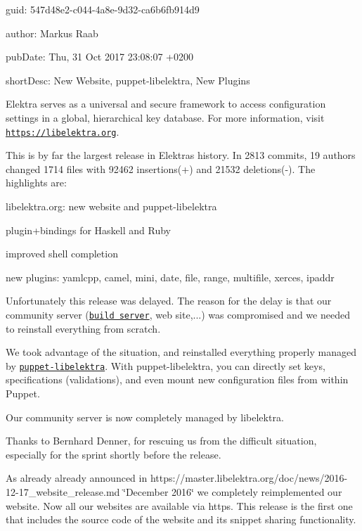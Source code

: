 
\begin{DoxyItemize}
\item guid\+: 547d48e2-\/c044-\/4a8e-\/9d32-\/ca6b6fb914d9
\item author\+: Markus Raab
\item pub\+Date\+: Thu, 31 Oct 2017 23\+:08\+:07 +0200
\item short\+Desc\+: New Website, puppet-\/libelektra, New Plugins
\end{DoxyItemize}

Elektra serves as a universal and secure framework to access configuration settings in a global, hierarchical key database. For more information, visit \href{https://libelektra.org}{\tt https\+://libelektra.\+org}.

This is by far the largest release in Elektra\textquotesingle{}s history. In 2813 commits, 19 authors changed 1714 files with 92462 insertions(+) and 21532 deletions(-\/). The highlights are\+:


\begin{DoxyItemize}
\item libelektra.\+org\+: new website and puppet-\/libelektra
\item plugin+bindings for Haskell and Ruby
\item improved shell completion
\item new plugins\+: yamlcpp, camel, mini, date, file, range, multifile, xerces, ipaddr
\end{DoxyItemize}

Unfortunately this release was delayed. The reason for the delay is that our community server (\href{https://build.libelektra.org}{\tt build server}, web site,...) was compromised and we needed to reinstall everything from scratch.

We took advantage of the situation, and reinstalled everything properly managed by \href{https://github.com/ElektraInitiative/puppet-libelektra}{\tt puppet-\/libelektra}. With puppet-\/libelektra, you can directly set keys, specifications (validations), and even mount new configuration files from within Puppet.

Our community server is now completely managed by libelektra.

Thanks to Bernhard Denner, for rescuing us from the difficult situation, especially for the sprint shortly before the release.

As already already announced in https\+://master.libelektra.\+org/doc/news/2016-\/12-\/17\+\_\+website\+\_\+release.md \char`\"{}\+December 2016\char`\"{} we completely reimplemented our website. Now all our websites are available via https. This release is the first one that includes the source code of the website and its snippet sharing functionality.

